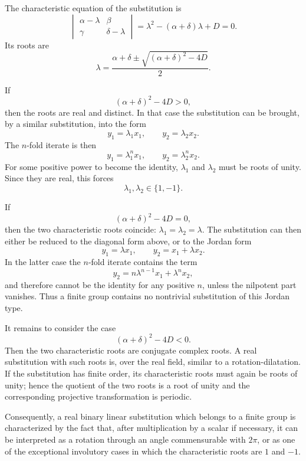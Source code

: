 \documentclass[11pt,a4paper]{book}
\begin{document}
The characteristic equation of the substitution is
\begin{equation}
\begin{vmatrix}
\alpha-\lambda & \beta\\
\gamma & \delta-\lambda
\end{vmatrix}
=
\lambda^2-(\alpha+\delta)\lambda+D=0.
\end{equation}
Its roots are
\begin{equation}
\lambda=
\frac{\alpha+\delta\pm\sqrt{(\alpha+\delta)^2-4D}}{2}.
\end{equation}

If
\[
(\alpha+\delta)^2-4D>0,
\]
then the roots are real and distinct.  In that case the substitution can be brought, by a similar substitution, into the form
\begin{equation}
y_1=\lambda_1x_1,\qquad y_2=\lambda_2x_2.
\end{equation}
The \(n\)-fold iterate is then
\[
y_1=\lambda_1^n x_1,\qquad y_2=\lambda_2^n x_2.
\]
For some positive power to become the identity, \(\lambda_1\) and \(\lambda_2\) must be roots of unity.  Since they are real, this forces
\[
\lambda_1,\lambda_2\in\{1,-1\}.
\]

If
\[
(\alpha+\delta)^2-4D=0,
\]
then the two characteristic roots coincide: \(\lambda_1=\lambda_2=\lambda\).  The substitution can then either be reduced to the diagonal form above, or to the Jordan form
\begin{equation}
y_1=\lambda x_1,\qquad y_2=x_1+\lambda x_2.
\end{equation}
In the latter case the \(n\)-fold iterate contains the term
\[
y_2=n\lambda^{n-1}x_1+\lambda^n x_2,
\]
and therefore cannot be the identity for any positive \(n\), unless the nilpotent part vanishes.  Thus a finite group contains no nontrivial substitution of this Jordan type.

It remains to consider the case
\[
(\alpha+\delta)^2-4D<0.
\]
Then the two characteristic roots are conjugate complex roots.  A real substitution with such roots is, over the real field, similar to a rotation-dilatation.  If the substitution has finite order, its characteristic roots must again be roots of unity; hence the quotient of the two roots is a root of unity and the corresponding projective transformation is periodic.

Consequently, a real binary linear substitution which belongs to a finite group is characterized by the fact that, after multiplication by a scalar if necessary, it can be interpreted as a rotation through an angle commensurable with \(2\pi\), or as one of the exceptional involutory cases in which the characteristic roots are \(1\) and \(-1\).
\end{document}
